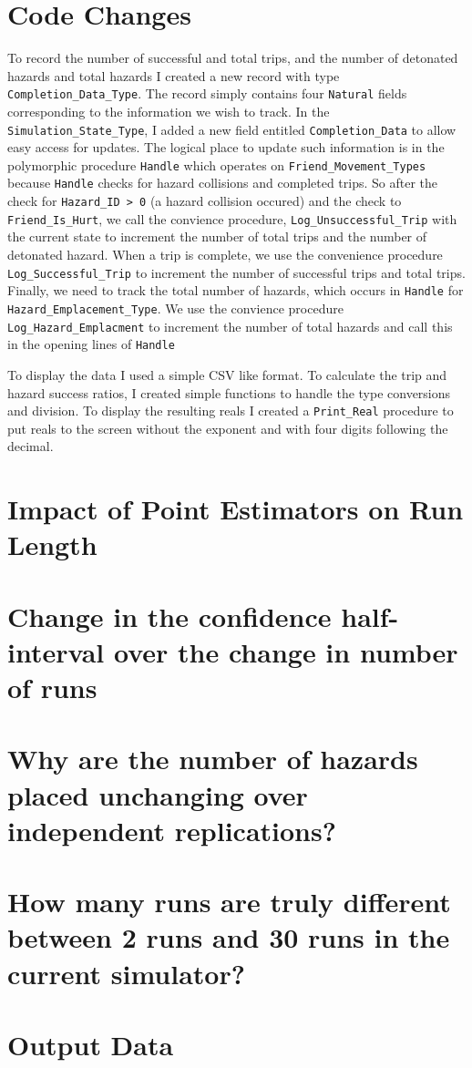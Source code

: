 \documentclass[12pt,letterpaper,titlepage]{article}
\newcommand{\code}[1]{\texttt{#1}}
\begin{document}

\doublespacing

\section{Code Changes}

To record the number of successful and total trips, and the number of
detonated hazards and total hazards I created a new record with type
\code{Completion_Data_Type}.  The record simply contains four
\code{Natural} fields corresponding to the information we wish to
track.  In the \code{Simulation_State_Type}, I added a new field
entitled \code{Completion_Data} to allow easy access for updates.  The
logical place to update such information is in the polymorphic
procedure \code{Handle} which operates on \code{Friend_Movement_Types}
because \code{Handle} checks for hazard collisions and completed
trips.  So after the check for \code{Hazard_ID > 0} (a hazard
collision occured) and the check to \code{Friend_Is_Hurt}, we call the
convience procedure, \code{Log_Unsuccessful_Trip} with the current
state to increment the number of total trips and the number of
detonated hazard.  When a trip is complete, we use the convenience
procedure \code{Log_Successful_Trip} to increment the number of
successful trips and total trips.  Finally, we need to track the total
number of hazards, which occurs in \code{Handle} for
\code{Hazard_Emplacement_Type}.  We use the convience procedure
\code{Log_Hazard_Emplacment} to increment the number of total hazards
and call this in the opening lines of \code{Handle}

To display the data I used a simple CSV like format.  To calculate the
trip and hazard success ratios, I created simple functions to handle
the type conversions and division.  To display the resulting reals I
created a \code{Print_Real} procedure to put reals to the screen
without the exponent and with four digits following the decimal.
\section{Impact of Point Estimators on Run Length}
\section{Change in the confidence half-interval over the change in number of runs}

\section{Why are the number of hazards placed unchanging over independent replications?}

\section{How many runs are truly different between 2 runs and 30 runs in the current simulator?}

\section{Output Data}
\end{document}

